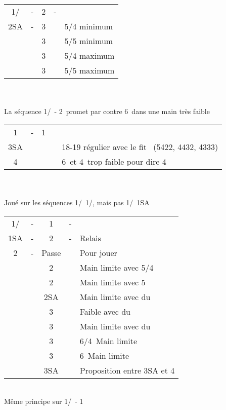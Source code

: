 \documentclass[a4paper, oneside, 11pt]{report}
\begin{document}
		\begin{tabular}{cccc|l}
		1\trefle/\carreau & - & 2\coeur & - &\\
		2SA & - & 3\trefle && 5/4 minimum\\
		&& 3\carreau && 5/5 minimum\\
		&& 3\coeur && 5/4 maximum\\
		&& 3\pique && 5/5 maximum\\
		\end{tabular}\\\\
	
		La séquence 1\trefle/\carreau\ - 2\pique\ promet par contre 6\pique\ dans une main très faible\\

		\begin{tabular}{cccc|l}
		1\trefle & - & 1\coeur &&\\
		3SA &&&& 18-19 régulier avec le fit \coeur\ (5422, 4432, 4333)\\
		4\coeur &&&& 6\trefle\ et 4\coeur\ trop faible pour dire 4\trefle\\
		\end{tabular}\\\\

		Joué sur les séquences 1\trefle/\carreau\ 1\coeur/\pique,  mais pas 1\trefle/\carreau\ 1SA\\

		\begin{tabular}{cccc|l}
		1\trefle/\carreau & - & 1\pique & - &\\
		1SA & - & 2\trefle & - & Relais\\
		2\carreau & - & Passe && Pour jouer\\
		&& 2\coeur && Main limite avec 5\pique/4\coeur\\
		&& 2\pique && Main limite avec 5\pique\\
		&& 2SA && Main limite avec du \trefle\\
		&& 3\trefle && Faible avec du \trefle\\
		&& 3\carreau && Main limite avec du \carreau\\
		&& 3\coeur && 6\pique/4\coeur\ Main limite\\
		&& 3\pique && 6\pique\ Main limite\\
		&& 3SA && Proposition entre 3SA et 4\pique\\
		\end{tabular}\\
		Même principe sur 1\trefle/\carreau\ - 1\coeur\\
		
\end{document}
